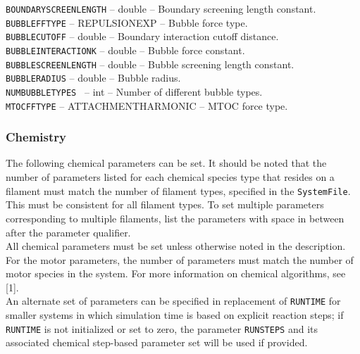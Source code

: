 \documentclass[11pt, oneside]{article}   	%
\begin{document}
     \noindent \texttt{BOUNDARYSCREENLENGTH} -- double -- Boundary screening length constant.\\
   
     \noindent \texttt{BUBBLEFFTYPE} -- REPULSIONEXP -- Bubble force type. \\
   
     \noindent  \texttt{BUBBLECUTOFF} -- double -- Boundary interaction cutoff distance.\\
   
     \noindent \texttt{BUBBLEINTERACTIONK} -- double -- Bubble force constant. \\
   
     \noindent \texttt{BUBBLESCREENLENGTH} -- double -- Bubble screening length constant.\\
   
     \noindent \texttt{BUBBLERADIUS} -- double -- Bubble radius.\\
   
     \noindent \texttt{NUMBUBBLETYPES } -- int -- Number of different bubble types.\\
     
      \noindent \texttt{MTOCFFTYPE} -- ATTACHMENTHARMONIC -- MTOC force type. \\

\normalsize

\subsubsection{Chemistry}

The following chemical parameters can be set. It should be noted that the number of parameters listed for each chemical species type that resides on a filament must match the number of filament types, specified in the \texttt{SystemFile}. This must be consistent for all filament types. To set multiple parameters corresponding to multiple filaments, list the parameters with space in between after the parameter qualifier. \\

\noindent All chemical parameters must be set unless otherwise noted in the description. For the motor parameters, the number of parameters must match the number of motor species in the system. For more information on chemical algorithms, see [1]. \\

\noindent An alternate set of parameters can be specified in replacement of \texttt{RUNTIME} for smaller systems in which simulation time is based on explicit reaction steps; if \texttt{RUNTIME} is not initialized or set to zero, the parameter \texttt{RUNSTEPS} and its associated chemical step-based parameter set will be used if provided.\\
\end{document}
